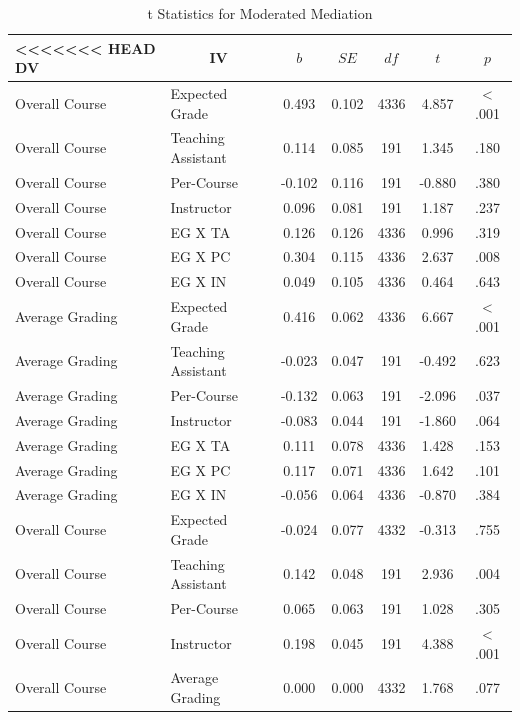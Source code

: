 \documentclass[,man]{apa6}
\theoremstyle{definition}
\theoremstyle{definition}
\theoremstyle{definition}
\theoremstyle{remark}
\begin{document}
\begin{table}[tbp]
\begin{center}
\begin{threeparttable}
\caption{\label{tab:table-mod-med}t Statistics for Moderated Mediation}
\small{
\begin{tabular}{llccccc}
\toprule
<<<<<<< HEAD
DV & \multicolumn{1}{c}{IV} & \multicolumn{1}{c}{$b$} & \multicolumn{1}{c}{$SE$} & \multicolumn{1}{c}{$df$} & \multicolumn{1}{c}{$t$} & \multicolumn{1}{c}{$p$}\\
\midrule
Overall Course & Expected Grade & 0.493 & 0.102 & 4336 & 4.857 & < .001\\
Overall Course & Teaching Assistant & 0.114 & 0.085 & 191 & 1.345 & .180\\
Overall Course & Per-Course & -0.102 & 0.116 & 191 & -0.880 & .380\\
Overall Course & Instructor & 0.096 & 0.081 & 191 & 1.187 & .237\\
Overall Course & EG X TA & 0.126 & 0.126 & 4336 & 0.996 & .319\\
Overall Course & EG X PC & 0.304 & 0.115 & 4336 & 2.637 & .008\\
Overall Course & EG X IN & 0.049 & 0.105 & 4336 & 0.464 & .643\\
Average Grading & Expected Grade & 0.416 & 0.062 & 4336 & 6.667 & < .001\\
Average Grading & Teaching Assistant & -0.023 & 0.047 & 191 & -0.492 & .623\\
Average Grading & Per-Course & -0.132 & 0.063 & 191 & -2.096 & .037\\
Average Grading & Instructor & -0.083 & 0.044 & 191 & -1.860 & .064\\
Average Grading & EG X TA & 0.111 & 0.078 & 4336 & 1.428 & .153\\
Average Grading & EG X PC & 0.117 & 0.071 & 4336 & 1.642 & .101\\
Average Grading & EG X IN & -0.056 & 0.064 & 4336 & -0.870 & .384\\
Overall Course & Expected Grade & -0.024 & 0.077 & 4332 & -0.313 & .755\\
Overall Course & Teaching Assistant & 0.142 & 0.048 & 191 & 2.936 & .004\\
Overall Course & Per-Course & 0.065 & 0.063 & 191 & 1.028 & .305\\
Overall Course & Instructor & 0.198 & 0.045 & 191 & 4.388 & < .001\\
Overall Course & Average Grading & 0.000 & 0.000 & 4332 & 1.768 & .077\\

\end{tabular}}
\end{threeparttable}
\end{center}
\end{table}
\end{document}
